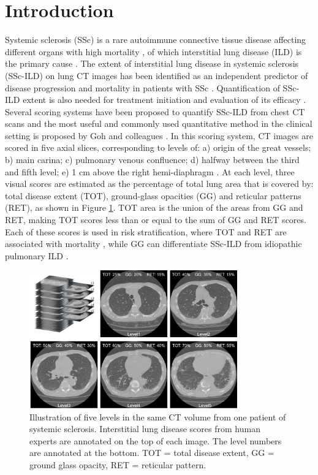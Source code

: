 \clearpage


\section{Introduction}
\label{sec:introduction}
Systemic sclerosis (SSc) is a rare autoimmune connective tissue disease affecting different organs with high mortality \cite{Denton2017}, of which interstitial lung disease (ILD) is the primary cause \cite{Wells2014}. The extent of interstitial lung disease in systemic sclerosis (SSc-ILD) on lung CT images has been identified as an independent predictor of disease progression and mortality in patients with SSc \cite{Chassagnon2020}. Quantification of SSc-ILD extent is also needed for treatment initiation and evaluation of its efficacy \cite{Wells2014}. Several scoring systems have been proposed to quantify SSc-ILD from chest CT scans \cite{Assayag2012} and the most useful and commonly used quantitative method in the clinical setting is proposed by Goh and colleagues \cite{Assayag2012, Goh2008}. In this scoring system, CT images are scored in five axial slices, corresponding to levels of: a) origin of the great vessels; b) main carina; c) pulmonary venous confluence; d) halfway between the third and fifth level; e) 1 cm above the right hemi-diaphragm \cite{Goh2008}. At each level, three visual scores are estimated as the percentage of total lung area that is covered by: total disease extent (TOT), ground-glass opacities (GG) and reticular patterns (RET), as shown in Figure \ref{fig1}. TOT area is the union of the areas from GG and RET, making TOT scores less than or equal to the sum of GG and RET scores. Each of these scores is used in risk stratification, where TOT and RET are associated with mortality \cite{Goh2008}, while GG can differentiate SSc-ILD from idiopathic pulmonary ILD \cite{Desai2004}.
 

\begin{figure}[tb]
    \centering
    \includegraphics[width=0.8\textwidth]{figure1.png}
    \caption{Illustration of five levels in the same CT volume from one patient of systemic sclerosis. Interstitial lung disease scores from human experts are annotated on the top of each image. The level numbers are annotated at the bottom. TOT = total disease extent, GG = ground glass opacity, RET = reticular pattern.}
    \label{fig1}
\end{figure}

